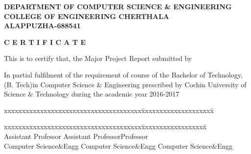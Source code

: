 \documentclass[12pt,a4paper,oneside]{report}
\begin{document}
\begin{titlepage}
\begin{center}

\large{\textbf{DEPARTMENT OF COMPUTER SCIENCE \& ENGINEERING}}\\
\large{\textbf{COLLEGE OF ENGINEERING CHERTHALA\\ALAPPUZHA-688541}}\\
\end{center}
\begin{figure}[h]
\begin{center}
\end{center}
\end{figure}
\begin{center}
\large{\textbf{C E R T I F I C A T E}}\\
\end{center}
\begin{spacing}{1.5}
\par This is to certify that, the Major Project Report submitted by \\

\par In partial fulﬁlment of the requirement of course of the Bachelor of Technology, (B. Tech)in Computer Science \& Engineering prescribed by Cochin University of Science \& Technology during the academic year 2016-2017\\ 
\end{spacing}
\begin{tabbing}
xxxxxxxxxxxxxxxxxxxxxxxxxxxxxxxxxxxxxx\= xxxxxxxxxxxxxxxxxxxx\= \kill
\hspace{.4in}{\bf Guide} \>\hspace{-.5in}{\bf Co-ordinator}\hspace{1.7in}{\bf  HoD  } \\
\end{tabbing}
\begin{tabbing}
xxxxxxxxxxxxxxxxxxxxxxxxxxxxxxxxxxxxxx\= xxxxxxxxxxxxxxxxxx\= \kill
   \>\hspace{-.7in}{\bf Mr. Muhammed Ilyas H} \hspace{.65 in}{\bf Dr. Preetha Theresa Joy }\\
\hspace{.15in}Assistant Professor    \>\hspace{-.7in}Assistant Professor\>\hspace{.23in}Professor\\
\hspace{.1in} Computer Science\&Engg    \>\hspace{-.75in}    Computer Science\&Engg \>\hspace{.18in}    Computer Science\&Engg\\

\end{tabbing}
\end{titlepage}
\end{document}
